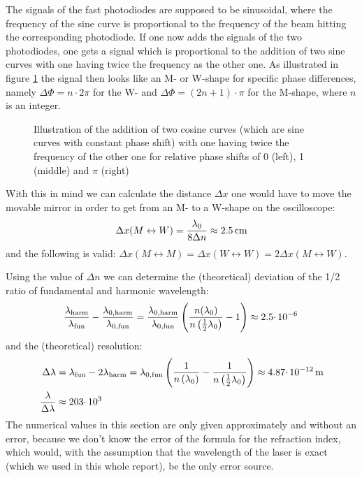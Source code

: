 \documentclass{protokoll_en}
\begin{document}
The signals of the fast photodiodes are supposed to be sinusoidal, where the frequency of the sine curve is proportional to the frequency of the beam hitting the corresponding photodiode. If one now adds the signals of the two photodiodes, one gets a signal which is proportional to the addition of two sine curves with one having twice the frequency as the other one. As illustrated in figure \ref{fig:ana_sines} the signal then looks like an M- or W-shape for specific phase differences, namely $\Delta \Phi = n\cdotp 2\pi$ for the W- and $\Delta \Phi = (2n+1)\cdotp\pi$ for the M-shape, where $n$ is an integer.
\begin{figure}[H]
\begin{floatrow}
\resizebox{0.33\textwidth}{!}{
 
}
\resizebox{0.33\textwidth}{!}{
 
}
\resizebox{0.33\textwidth}{!}{
 
}
\end{floatrow}
\caption{Illustration of the addition of two cosine curves (which are sine curves with constant phase shift) with one having twice the frequency of the other one for relative phase shifts of 0 (left), 1 (middle) and $\pi$ (right)}
\label{fig:ana_sines}
\end{figure}
With this in mind we can calculate the distance $\Delta x$ one would have to move the movable mirror in order to get from an M- to a W-shape on the oscilloscope:
\begin{align}
\Delta x (M\leftrightarrow W) = \frac{\lambda_0}{8\Delta n} \approx \unit[2.5]{cm}
\end{align}
and the following is valid: $\Delta x (M\leftrightarrow M) = \Delta x (W\leftrightarrow W) = 2\Delta x (M\leftrightarrow W)$.

Using the value of $\Delta n$ we can determine the (theoretical) deviation of the 1/2 ratio of fundamental and harmonic wavelength:
\begin{align}
\frac{\lambda_\textrm{harm}}{\lambda_\textrm{fun}} - \frac{\lambda_{0,\textrm{harm}}}{\lambda_{0,\textrm{fun}}} = \frac{\lambda_{0,\textrm{harm}}}{\lambda_{0,\textrm{fun}}}\left(\frac{n(\lambda_0)}{n\left(\frac{1}{2}\lambda_0\right)}-1\right)\approx \unit[2.5\cdotp 10^{-6}]{}
\end{align}
and the (theoretical) resolution:
\begin{align}
\Delta \lambda &= \lambda_\textrm{fun}-2\lambda_\textrm{harm}=\lambda_{0,\textrm{fun}}\left(\frac{1}{n\left(\lambda_0\right)}-\frac{1}{n\left(\frac{1}{2}\lambda_0\right)}\right)\approx \unit[4.87\cdotp 10^{-12}]{m}\\
\notag\frac{\lambda}{\Delta \lambda} &\approx 203\cdotp 10^{3}
\end{align}
The numerical values in this section are only given approximately and without an error, because we don't know the error of the formula for the refraction index, which would, with the assumption that the wavelength of the laser is exact (which we used in this whole report), be the only error source.
\end{document}
